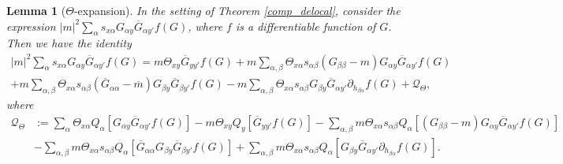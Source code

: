 \documentclass{article}
\newcommand{\1}{\mathds{1}}
\numberwithin{equation}{section}
\newcommand{\al}{\alpha}
\renewcommand{\cal}{\mathcal}
\newcommand{\Z}{\mathbb{Z}}
\DeclareMathOperator{\re}{Re}
\DeclareMathOperator{\im}{Im}
\theoremstyle{plain} %
\newtheorem{lemma}[theorem]{Lemma}
\theoremstyle{remark}
\begin{document}
  \begin{lemma}[$\Theta$-expansion]   \label{expandtheta}
In the setting of Theorem \ref{comp_delocal}, consider the expression $|m|^2\sum_\al s_{x\al}G_{\al y}  \overline G_{\al y' }  f(G)$, where  %
$f$ is a differentiable function of $G$. %
Then we have the identity 
\begin{align}
  |m|^2 \sum_{\al}s_{x\al}G_{\al y}  \overline G_{\al y'}  f(G) = m  \Theta_{xy}   \overline G_{yy'} f(G)  +  m \sum_{\al,\beta} \Theta_{x\al} s_{\al\beta}   (G_{\beta \beta}-m) G_{\al y} \overline G_{\al y'} f(G)\nonumber \\
 +m \sum_{\al,\beta} \Theta_{x\al}  s_{\al\beta} ( \overline G_{\al\al} -\overline m)G_{\beta y}\overline G_{\beta y'}  f(G)- m\sum_{\al,\beta}  \Theta_{x\al} s_{\al\beta}  G_{\beta y} \overline G_{\al y'} \partial_{ h_{\beta \al}}f(G) +\cal Q_\Theta ,  \label{Otheta}
 \end{align} 
 where
 \begin{align*}
	\cal Q_\Theta&:=  \sum_{\al}\Theta_{x\al} Q_\al \left[G_{\al y} \overline G_{\al y'} f(G)\right]- m  \Theta_{xy}  Q_y\left[  \overline G_{yy'} f(G)\right] - \sum_{\al,\beta} m \Theta_{x\al} s_{\al\beta}  Q_\al\left[   (G_{\beta \beta}-m) G_{\al y} \overline G_{\al y'} f(G)\right]  \\
	& - \sum_{\al,\beta} m\Theta_{x\al}  s_{\al\beta}  Q_\al\left[    \overline G_{\al\al} G_{\beta y}\overline G_{\beta y'}  f(G)\right] + \sum_{\al,\beta} m \Theta_{x\al} s_{\al\beta} Q_\al\left[  G_{\beta y} \overline G_{\al y'} \partial_{ h_{\beta\al}}f(G)\right].

\end{align*}
\end{lemma}
\end{document}
